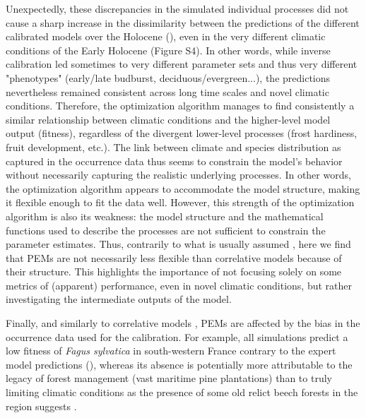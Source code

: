 \documentclass[preprint,12pt,authoryear]{elsarticle}
\begin{document}
Unexpectedly, these discrepancies in the simulated individual processes did not cause a sharp increase in the dissimilarity between the predictions of the different calibrated models over the Holocene (), even in the very different climatic conditions of the Early Holocene (Figure S4). In other words, while inverse calibration led sometimes to very different parameter sets and thus very different "phenotypes" (early/late budburst, deciduous/evergreen...), the predictions nevertheless remained consistent across long time scales and novel climatic conditions. Therefore, the optimization algorithm manages to find consistently a similar relationship between climatic conditions and the higher-level model output (fitness), regardless of the divergent lower-level processes (frost hardiness, fruit development, etc.). The link between climate and species distribution as captured in the occurrence data thus seems to constrain the model's behavior without necessarily capturing the realistic underlying processes. In other words, the optimization algorithm appears to accommodate the model structure, making it flexible enough to fit the data well. However, this strength of the optimization algorithm is also its weakness: the model structure and the mathematical functions used to describe the processes are not sufficient to constrain the parameter estimates. Thus, contrarily to what is usually assumed \citep{Higgins2020}, here we find that PEMs are not necessarily less flexible than correlative models because of their structure. This highlights the importance of not focusing solely on some metrics of (apparent) performance, even in novel climatic conditions, but rather investigating the intermediate outputs of the model.

Finally, and similarly to correlative models \citep{BarbetMassin2010, Duputie2014},  PEMs are affected by the bias in the occurrence data used for the calibration. For example, all simulations predict a low fitness of \emph{Fagus sylvatica} in south-western France contrary to the expert model predictions (), whereas its absence is potentially more attributable to the legacy of forest management (vast maritime pine plantations) than to truly limiting climatic conditions as the presence of some old relict beech forests in the region suggests \citep{Lafontaine2014}.
\end{document}
